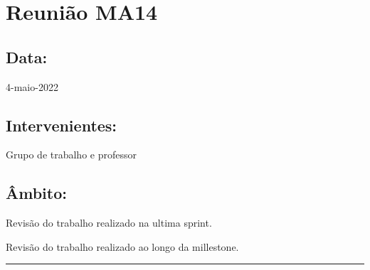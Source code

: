 \section{Reunião MA14}\label{reuniaoMA14}

\subsection*{Data:}
4-maio-2022

\subsection*{Intervenientes:}
Grupo de trabalho e professor

\subsection*{Âmbito:}
Revisão do trabalho realizado na ultima sprint. 

Revisão do trabalho realizado ao longo da millestone.



\noindent \rule{\linewidth}{0.4pt}
\newline